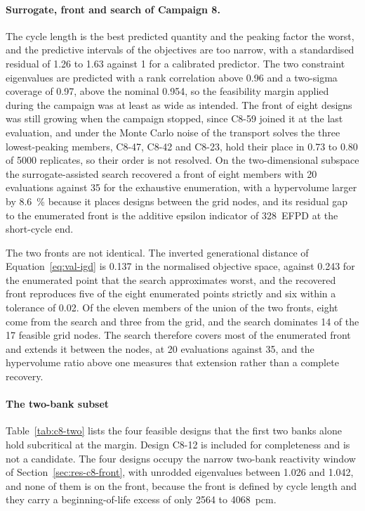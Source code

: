 \paragraph{Surrogate, front and search of Campaign 8.}
\label{sec:res-c8-cv}\label{sec:res-c8-stability}\label{sec:res-c8-valgrid}
The cycle length is the best predicted quantity and the peaking factor
the worst, and the predictive intervals of the objectives are too
narrow, with a standardised residual of 1.26 to 1.63 against 1 for a
calibrated predictor. The two constraint eigenvalues are predicted with
a rank correlation above 0.96 and a two-sigma coverage of 0.97, above
the nominal 0.954, so the feasibility margin applied during the
campaign was at least as wide as intended. The front of eight designs
was still growing when the campaign stopped, since C8-59 joined it at
the last evaluation, and under the Monte Carlo noise of the transport
solves the three lowest-peaking members, C8-47, C8-42 and C8-23, hold
their place in 0.73 to 0.80 of 5000 replicates, so their order is not
resolved. On the two-dimensional subspace the surrogate-assisted search
recovered a front of eight members with 20 evaluations against 35 for
the exhaustive enumeration, with a hypervolume larger by
\SI{8.6}{\%} because it places designs between the grid nodes, and its
residual gap to the enumerated front is the additive epsilon indicator
of \SI{328}{EFPD} at the short-cycle end.

The two fronts are not identical. The inverted generational distance of
Equation~\eqref{eq:val-igd} is 0.137 in the normalised objective space,
against 0.243 for the enumerated point that the search approximates
worst, and the recovered front reproduces five of the eight enumerated
points strictly and six within a tolerance of 0.02. Of the eleven
members of the union of the two fronts, eight come from the search and
three from the grid, and the search dominates 14 of the 17 feasible
grid nodes. The search therefore covers most of the enumerated front
and extends it between the nodes, at 20 evaluations against 35, and the
hypervolume ratio above one measures that extension rather than a
complete recovery.

\paragraph{The two-bank subset}
\label{sec:res-c8-split}

Table~\ref{tab:c8-two} lists the four feasible designs that the first
two banks alone hold subcritical at the margin. Design C8-12 is included
for completeness and is not a candidate. The four designs occupy the
narrow two-bank reactivity window of Section~\ref{sec:res-c8-front}, with
unrodded eigenvalues between 1.026 and 1.042, and none of them is on
the front, because the front is defined by cycle length and they carry
a beginning-of-life excess of only \num{2564} to \SI{4068}{pcm}.

